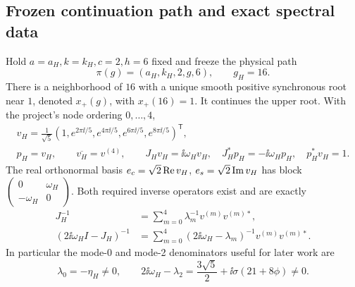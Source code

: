 \subsection{Frozen continuation path and exact spectral data}
\label{slot:P11-3}
\begin{proposition}
\label{prop:P11-data}
Hold $a=a_H,k=k_H,c=2,h=6$ fixed and freeze the physical path
\begin{equation}
 \boxed{\pi(g)=(a_H,k_H,2,g,6),\qquad g_H=16.}
 \label{eq:P11-path}
\end{equation}
There is a neighborhood of $16$ with a unique smooth positive
synchronous root near $1$, denoted $x_+(g)$, with $x_+(16)=1$.
It continues the upper root. With the project's node ordering $0,\ldots,4$,
\begin{equation}
 \begin{gathered}
 v_H=\frac1{\sqrt5}(1,e^{2\pi\ii/5},e^{4\pi\ii/5},
                         e^{6\pi\ii/5},e^{8\pi\ii/5})^{\mathsf T},\\
 p_H=v_H,\qquad \overline{v_H}=v^{(4)},\qquad
 J_Hv_H=\ii\omega_Hv_H,\quad J_H^*p_H=-\ii\omega_Hp_H,
 \quad p_H^*v_H=1.
 \end{gathered}
 \label{eq:P11-five-vectors}
\end{equation}
The real orthonormal basis $e_c=\sqrt2\operatorname{Re} v_H$,
$e_s=\sqrt2\operatorname{Im} v_H$ has block
$\left(\begin{smallmatrix}0&\omega_H\\-\omega_H&0\end{smallmatrix}\right)$.
Both required inverse operators exist and are exactly
\begin{equation}
 \begin{split}
 J_H^{-1}&=\sum_{m=0}^4\lambda_m^{-1}v^{(m)}v^{(m)*},\\
 (2\ii\omega_H I-J_H)^{-1}
   &=\sum_{m=0}^4(2\ii\omega_H-\lambda_m)^{-1}v^{(m)}v^{(m)*}.
 \end{split}
 \label{eq:P11-five-resolvents}
\end{equation}
In particular the mode-0 and mode-2 denominators useful for later work are
\begin{equation}
 \lambda_0=-\eta_H\ne0,\qquad
 2\ii\omega_H-\lambda_2
       =\frac{3\sqrt5}{2}+\ii\sigma(21+8\phi)\ne0.
 \label{eq:P11-denominators}
\end{equation}
\end{proposition}
